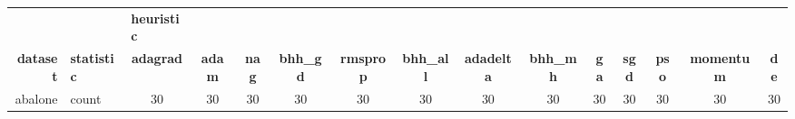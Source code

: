 \begin{table}[H]
{\begin{tabular}{rlccc|c|c|c|c|c|ccccc}
			                                                                               &                    & \multicolumn{1}{l}{\textbf{heuristic}}                                         &                                                                                & \multicolumn{1}{r}{}                                                           & \multicolumn{1}{r}{}                            & \multicolumn{1}{r}{}                                                           & \multicolumn{1}{r}{}                            & \multicolumn{1}{r}{}                                                           & \multicolumn{1}{r}{}                            &                                                 &                                                 &                                                 &                                                 &                                                 \\
			\cmidrule{3-3}\cmidrule{6-6}\cmidrule{8-8}\cmidrule{10-10}    \textbf{dataset} & \textbf{statistic} & \textbf{adagrad}                                                               & \textbf{adam}                                                                  & \textbf{nag}                                                                   & \textbf{bhh\_gd}                                & \textbf{rmsprop}                                                               & \textbf{bhh\_all}                               & \textbf{adadelta}                                                              & \textbf{bhh\_mh}                                & \textbf{ga}                                     & \textbf{sgd}                                    & \textbf{pso}                                    & \textbf{momentum}                               & \textbf{de}                                     \\
			\midrule
			abalone                                                                        & count              & 30                                                                             & 30                                                                             & 30                                                                             & 30                                              & 30                                                                             & 30                                              & 30                                                                             & 30                                              & 30                                              & 30                                              & 30                                              & 30                                              & 30                                              \\

\end{tabular}}
\end{table}
